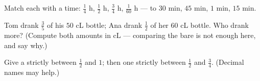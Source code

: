 \begin{exercise}[$\star$]\label{exo:g5:fractions:9}
Match each  with a time: $\frac14$ h, $\frac12$ h,
$\frac34$ h, $\frac{1}{60}$ h --- to $30$ min, $45$ min, $1$ min,
$15$ min.
\end{exercise}

\begin{exercise}[$\star\star$]\label{exo:g5:fractions:10}
Tom drank $\frac35$ of his $50$ cL bottle; Ana drank $\frac12$ of
her $60$ cL bottle. Who drank more? (Compute both amounts in cL ---
comparing the bare  is not enough here, and say why.)
\end{exercise}

\begin{exercise}[$\star\star$]\label{exo:g5:fractions:11}
Give a  strictly between $\frac12$ and $1$; then one
strictly between $\frac12$ and $\frac34$. (Decimal names may
help.)
\end{exercise}
